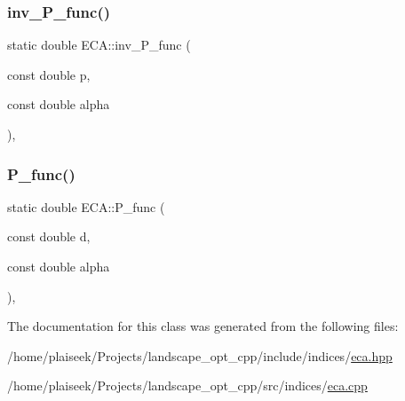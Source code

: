 \subsubsection{\texorpdfstring{inv\+\_\+\+P\+\_\+func()}{inv\_P\_func()}}
{\footnotesize\ttfamily static double E\+C\+A\+::inv\+\_\+\+P\+\_\+func (\begin{DoxyParamCaption}\item[{const double}]{p,  }\item[{const double}]{alpha }\end{DoxyParamCaption})\hspace{0.3cm}{\ttfamily [inline]}, {\ttfamily [static]}}

\mbox{\label{class_e_c_a_ad9a7a487c43cecdaea971ffba0098474}} 
\subsubsection{\texorpdfstring{P\+\_\+func()}{P\_func()}}
{\footnotesize\ttfamily static double E\+C\+A\+::\+P\+\_\+func (\begin{DoxyParamCaption}\item[{const double}]{d,  }\item[{const double}]{alpha }\end{DoxyParamCaption})\hspace{0.3cm}{\ttfamily [inline]}, {\ttfamily [static]}}



The documentation for this class was generated from the following files\+:\begin{DoxyCompactItemize}
\item 
/home/plaiseek/\+Projects/landscape\+\_\+opt\+\_\+cpp/include/indices/\hyperlink{eca_8hpp}{eca.\+hpp}\item 
/home/plaiseek/\+Projects/landscape\+\_\+opt\+\_\+cpp/src/indices/\hyperlink{eca_8cpp}{eca.\+cpp}\end{DoxyCompactItemize}
